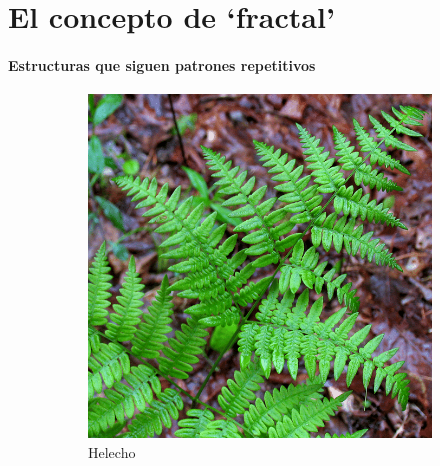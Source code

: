 \titleframe


\section{El concepto de `fractal'}

\begin{frame}{\insertsectionhead}
\framesubtitle{Estructuras que siguen patrones repetitivos}

\begin{figure}[ht!]
    \begin{subfigure}[b]{0.3\textwidth}
      \includegraphics[width=\textwidth]{screenshots/helecho.png}
      \caption*{Helecho}
    \end{subfigure}
    \hspace{\fill}
    \begin{subfigure}[b]{0.3\textwidth}

\end{subfigure}
\end{figure}
\end{frame}
